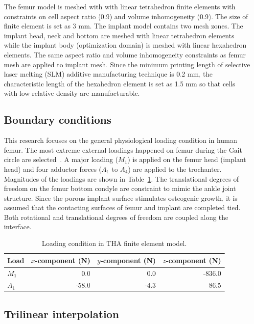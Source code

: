 \documentclass[12pt]{extbook}
\begin{document}
The femur model is meshed with with linear tetrahedron finite elements with constraints on cell aspect ratio (0.9) and volume inhomogeneity (0.9). The size of finite element is set as 3 mm. The implant model contains two mesh zones. The implant head, neck and bottom are meshed with linear tetrahedron elements while the implant body (optimization domain) is meshed with linear hexahedron elements. The same aspect ratio and volume inhomogeneity constraints as femur mesh are applied to implant mesh. Since the minimum printing length of selective laser melting (SLM) additive manufacturing technique is 0.2 mm, the characteristic length of the hexahedron element is set as 1.5 mm so that cells with low relative density are manufacturable.\\

\subsection{Boundary conditions}

This research focuses on the general physiological loading condition in human femur. The most extreme external loadings happened on femur during the Gait circle are selected~\cite{arabnejad2017fully}. A major loading ($M_1$) is applied on the femur head (implant head) and four adductor forces ($A_1$ to $A_4$) are applied to the trochanter. Magnitudes of the loadings are shown in Table~\ref{loading}. The translational degrees of freedom on the femur bottom condyle are constraint to mimic the ankle joint structure. Since the porous implant surface stimulates osteogenic growth, it is assumed that the contacting surfaces of femur and implant are completed tied. Both rotational and translational degrees of freedom are coupled along the interface.\\

\begin{table}[htbp]
\centering
\caption{Loading condition in THA finite element model.}
\begin{tabular}{lrrr}
\hline\hline
Load & $x$-component (N) & $y$-component (N) & $z$-component (N)\\
\hline
$M_1$ & 0.0 & 0.0 & -836.0\\
$A_1$ & -58.0 & -4.3 & 86.5\\
\hline\hline
\end{tabular}
\label{loading}
\end{table}

\subsection{Trilinear interpolation}
\end{document}
